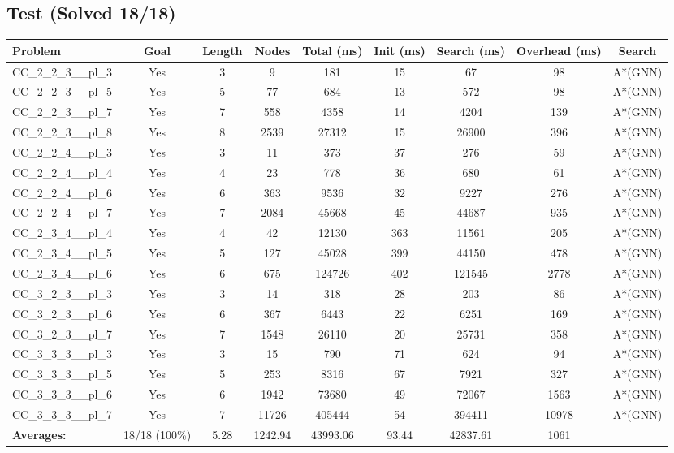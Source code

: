 \documentclass{article}
\begin{document}
\subsection*{Test (Solved 18/18)}
\begin{tabular}{lcccccccc}
\toprule
Problem & Goal & Length & Nodes & Total (ms) & Init (ms) & Search (ms) & Overhead (ms) & Search \\
\midrule
CC\_2\_2\_3\_\_pl\_3 & Yes & 3 & 9 & 181 & 15 & 67 & 98 & A*(GNN) \\
CC\_2\_2\_3\_\_pl\_5 & Yes & 5 & 77 & 684 & 13 & 572 & 98 & A*(GNN) \\
CC\_2\_2\_3\_\_pl\_7 & Yes & 7 & 558 & 4358 & 14 & 4204 & 139 & A*(GNN) \\
CC\_2\_2\_3\_\_pl\_8 & Yes & 8 & 2539 & 27312 & 15 & 26900 & 396 & A*(GNN) \\
CC\_2\_2\_4\_\_pl\_3 & Yes & 3 & 11 & 373 & 37 & 276 & 59 & A*(GNN) \\
CC\_2\_2\_4\_\_pl\_4 & Yes & 4 & 23 & 778 & 36 & 680 & 61 & A*(GNN) \\
CC\_2\_2\_4\_\_pl\_6 & Yes & 6 & 363 & 9536 & 32 & 9227 & 276 & A*(GNN) \\
CC\_2\_2\_4\_\_pl\_7 & Yes & 7 & 2084 & 45668 & 45 & 44687 & 935 & A*(GNN) \\
CC\_2\_3\_4\_\_pl\_4 & Yes & 4 & 42 & 12130 & 363 & 11561 & 205 & A*(GNN) \\
CC\_2\_3\_4\_\_pl\_5 & Yes & 5 & 127 & 45028 & 399 & 44150 & 478 & A*(GNN) \\
CC\_2\_3\_4\_\_pl\_6 & Yes & 6 & 675 & 124726 & 402 & 121545 & 2778 & A*(GNN) \\
CC\_3\_2\_3\_\_pl\_3 & Yes & 3 & 14 & 318 & 28 & 203 & 86 & A*(GNN) \\
CC\_3\_2\_3\_\_pl\_6 & Yes & 6 & 367 & 6443 & 22 & 6251 & 169 & A*(GNN) \\
CC\_3\_2\_3\_\_pl\_7 & Yes & 7 & 1548 & 26110 & 20 & 25731 & 358 & A*(GNN) \\
CC\_3\_3\_3\_\_pl\_3 & Yes & 3 & 15 & 790 & 71 & 624 & 94 & A*(GNN) \\
CC\_3\_3\_3\_\_pl\_5 & Yes & 5 & 253 & 8316 & 67 & 7921 & 327 & A*(GNN) \\
CC\_3\_3\_3\_\_pl\_6 & Yes & 6 & 1942 & 73680 & 49 & 72067 & 1563 & A*(GNN) \\
CC\_3\_3\_3\_\_pl\_7 & Yes & 7 & 11726 & 405444 & 54 & 394411 & 10978 & A*(GNN) \\
\textbf{Averages:} & 18/18 (100\%) & 5.28 & 1242.94 & 43993.06 & 93.44 & 42837.61 & 1061 & \\
\bottomrule
\end{tabular}
\\[0.7cm]
\end{document}
